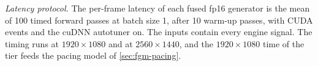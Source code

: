 \emph{Latency protocol.} The per-frame latency of each fused fp16 generator is the mean of 100 timed forward passes at batch size 1, after 10 warm-up passes, with CUDA events and the cuDNN autotuner on. The inputs contain every engine signal. The timing runs at $1920\times1080$ and at $2560\times1440$, and the $1920\times1080$ time of the  tier feeds the pacing model of \cref{sec:fgm-pacing}.
